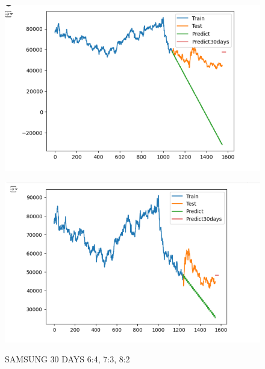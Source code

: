 \documentclass{article}
\begin{document}
\begin{multicols}{2}
\begin{figure}[H]
\begin{minipage}{0.15\textwidth}
    \label{fig:1}
    \end{minipage}%
    \begin{minipage}{0.15\textwidth}
    \centering
    \includegraphics[width=1\textwidth]{Image/ARIMA/30_7_3_SAMSUNG_Arima.png}
  
    \label{fig:2}
    \end{minipage}%
    \begin{minipage}{0.15\textwidth}
    \centering
    \includegraphics[width=1\textwidth]{Image/ARIMA/30_8_2_SAMSUNG_Arima.png}

    \label{fig:3}
    \end{minipage}
    \caption{SAMSUNG 30 DAYS  6:4, 7:3, 8:2 }
\end{figure}


\end{multicols}
\end{document}
